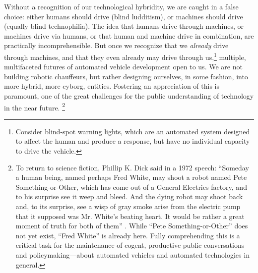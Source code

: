 

Without a recognition of our technological
hybridity, we are caught in a false choice:
either humans should drive (blind ludditism), or machines should 
drive (equally blind technophilia). The idea that humans drive through
machines, or machines drive 
via humans, or that human and machine drive in combination, are
practically incomprehensible. But once we
recognize that we \emph{already} drive through machines, and that they
even already may drive through us,\footnote{Consider blind-spot
warning lights, which are an automated system designed to affect the
human and produce a response, but have no individual capacity to drive
the vehicle.} multiple, multifaceted futures of automated vehicle
development open to us. We are not building robotic
chauffeurs, but rather designing ourselves, in some fashion, into more
hybrid, more cyborg, entities. Fostering an appreciation of this is paramount, one of the
  great challenges for the public understanding 
of technology in the near future. \footnote{To return to science fiction, Phillip K. Dick said in
a 1972 speech: ``Someday a human being, named perhaps Fred White, may shoot a robot
named Pete Something-or-Other, which has come out of a General
Electrics factory, and to his surprise see it weep and bleed. And the
dying robot may shoot back and, to its surprise, see a wisp of gray
smoke arise from the electric pump that it supposed was Mr. White's
beating heart. It would be rather a great moment of truth for both of
them'' \cite{androidHuman}.
While ``Pete Something-or-Other'' does not yet exist, ``Fred White''
is already here. Fully comprehending this is a critical task for the
maintenance of cogent, productive public conversations---and
policymaking---about automated vehicles and automated technologies in general.}



